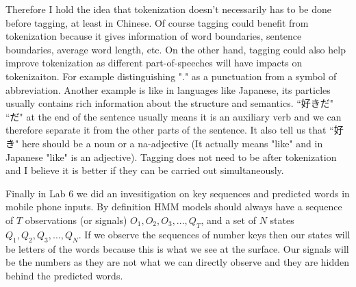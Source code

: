 \documentclass[11pt]{article} %
\begin{document}
Therefore I hold the idea that tokenization doesn't necessarily has to be done before tagging, at least in Chinese. Of course tagging could benefit from tokenization because it gives information of word boundaries, sentence boundaries, average word length, etc. On the other hand, tagging could also help improve tokenization as different part-of-speeches will have impacts on tokenizaiton. For example distinguishing "." as a punctuation from a symbol of abbreviation. Another example is like in languages like Japanese, its particles usually contains rich information about the structure and semantics. ``好きだ" ``だ" at the end of the sentence usually means it is an auxiliary verb and we can therefore separate it from the other parts of the sentence. It also tell us that ``好き" here should be a noun or a na-adjective (It actually means "like" and in Japanese "like" is an adjective). Tagging does not need to be after tokenization and I believe it is better if they can be carried out simultaneously.

Finally in Lab 6 we did an invesitigation on key sequences and predicted words in mobile phone inputs. By definition HMM models should always have a sequence of $T$ observations (or signals) $O_1, O_2, O_3, ..., Q_T$, and a set of $N$ states $Q_1, Q_2, Q_3, ..., Q_N$\cite{JurafskyMartin200805}. If we observe the sequences of number keys then our states will be letters of the words because this is what we see at the surface. Our signals will be the numbers as they are not what we can directly observe and they are hidden behind the predicted words.

\newpage
\printbibliography
\end{document}
